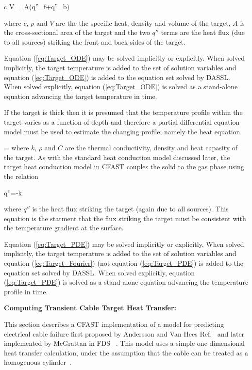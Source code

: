 \be c \rho V  = A(q''_f+q''_b) \label{eq:Target_ODE} \ee

where $c$, $\rho$ and $V$ are the the specific heat, density and volume of the target, $A$ is the cross-sectional area of the target and the two $q''$ terms are the heat flux (due to all sources) striking the front and back sides of the target.

Equation (\ref{eq:Target_ODE}) may be solved implicitly or explicitly.  When solved implicitly, the target temperature is added to the set of solution variables and equation (\ref{eq:Target_ODE}) is added to the equation set solved by DASSL.
When solved explicitly, equation (\ref{eq:Target_ODE}) is solved as a stand-alone equation advancing the target temperature in time.


If the target is thick then it is presumed that the temperature profile within the target varies as a function of depth and therefore a partial differential equation model must be used to estimate the changing profile; namely the heat equation

\be {} = 
\label{eq:Target_PDE} \ee
where $k$, $\rho$ and $C$ are the thermal conductivity, density and heat capasity of the target.  As with the standard heat conduction model discussed later, the target heat conduction model in CFAST couples the solid to the gas phase using the relation

\be q''=-k \label{eq:Target_Fourier}\ee

where $q''$ is the heat flux striking the target (again due to all sources).  This equation is the statment that the flux striking the target must be consistent with the temperature gradient at the surface.

Equation (\ref{eq:Target_PDE}) may be solved implicitly or explicitly.  When solved implicitly, the target temperature is added to the set of solution variables and equation (\ref{eq:Target_Fourier}) (not equation (\ref{eq:Target_PDE}) is added to the equation set solved by DASSL.
When solved explicitly, equation (\ref{eq:Target_PDE}) is solved as a stand-alone equation advancing the temperature profile in time.

{\bf Computing Transient Cable Target Heat Transfer:}

\newcommand{\Dt}{\Delta t}
\newcommand{\Dr}{\Delta r}
\newcommand{\Tipo}{T_{i+1}^{n+1}}
\newcommand{\Ti}{T_{i}^{n+1}}
\newcommand{\Timo}{T_{i-1}^{n+1}}

This section describes a CFAST implementation of a model for
predicting electrical cable failure first proposed
by Andersson and Van Hees Ref.~\cite{Andersson:2005}
and later implemented by McGrattan
in FDS~\cite{CAROLFIRE} .  This model uses a simple one-dimensional heat
transfer calculation, under the assumption that the cable can
be treated as a homogenous cylinder~\cite{Andersson:2005}.

